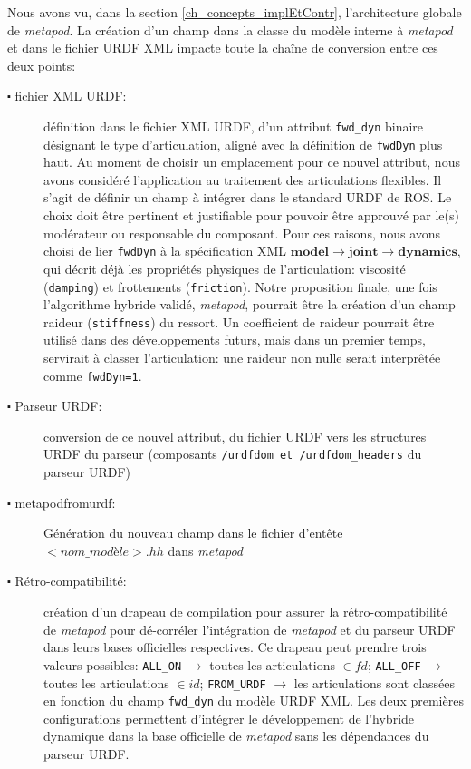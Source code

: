 \documentclass{report}
\begin{document}
Nous avons vu, dans la section \ref{ch_concepts_implEtContr}, l'architecture globale de \emph{metapod}. La création d'un champ dans la classe du modèle interne à \emph{metapod} et dans le fichier URDF XML impacte toute la chaîne de conversion entre ces deux points:
\begin{description}
\item[$\centerdot$ fichier XML URDF:] définition dans le fichier XML URDF, d'un attribut \verb;fwd_dyn; binaire désignant le type d'articulation, aligné avec la définition de \verb;fwdDyn; plus haut. Au moment de choisir un emplacement pour ce nouvel attribut, nous avons considéré l'application au traitement des articulations flexibles. Il s'agit de définir un champ à intégrer dans le standard URDF de ROS. Le choix doit être pertinent et justifiable pour pouvoir être approuvé par le(s) modérateur ou responsable du composant. Pour ces raisons, nous avons choisi de lier \verb;fwdDyn; à la spécification XML $\mathbf{model}  \longrightarrow \mathbf{joint}  \longrightarrow \mathbf{dynamics}$, qui décrit déjà les propriétés physiques de l'articulation: viscosité (\verb;damping;) et frottements (\verb;friction;). Notre proposition finale, une fois l'algorithme hybride validé, \emph{metapod}, pourrait être la création d'un champ raideur (\verb;stiffness;) du ressort. Un coefficient de raideur pourrait être utilisé dans des développements futurs, mais dans un premier temps, servirait à classer l'articulation: une raideur non nulle serait interprêtée comme \verb;fwdDyn=1;.
\item[$\centerdot$ Parseur URDF:] conversion de ce nouvel attribut, du fichier URDF vers les structures URDF du parseur (composants \verb;/urdfdom et /urdfdom_headers; du parseur URDF)
\item[$\centerdot$ metapodfromurdf:] Génération du nouveau champ dans le fichier d'entête $<nom\_modèle>.hh$ dans \emph{metapod}
\item[$\centerdot$ Rétro-compatibilité:] création d'un drapeau de compilation pour assurer la rétro-compatibilité de \emph{metapod} pour dé-corréler l'intégration de \emph{metapod} et du parseur URDF dans leurs bases officielles respectives. Ce drapeau peut prendre trois valeurs possibles: \verb;ALL_ON; $\longrightarrow$ toutes les articulations $\in fd$; \verb;ALL_OFF; $\longrightarrow$ toutes les articulations $\in id$; \verb;FROM_URDF; $\longrightarrow$ les articulations sont classées en fonction du champ \verb;fwd_dyn; du modèle URDF XML. Les deux premières configurations permettent d'intégrer le développement de l'hybride dynamique dans la base officielle de \emph{metapod} sans les dépendances du parseur URDF.
\end{description}
\bigskip
\end{document}
